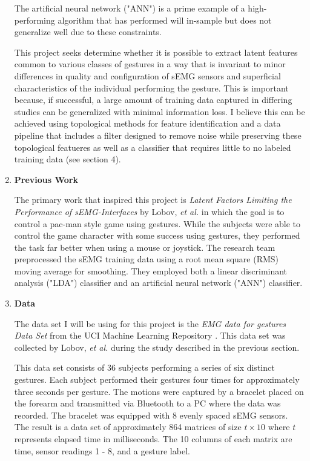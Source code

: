 \documentclass[11pt]{article}
\begin{document}
\begin{enumerate}
The artificial neural network ("ANN") is a prime example of a high-performing algorithm that has performed will in-sample but does not generalize well due to these constraints.

This project seeks determine whether it is possible to extract latent features common to various classes of gestures in a way that is invariant to minor differences in quality and configuration of sEMG sensors and superficial characteristics of the individual performing the gesture. This is important because, if successful, a large amount of training data captured in differing studies can be generalized with minimal information loss. I believe this can be achieved using topological methods for feature identification and a data pipeline that includes a filter designed to remove noise while preserving these topological featueres as well as a classifier that requires little to no labeled training data (see section 4).


\item \textbf{Previous Work}

The primary work that inspired this project is  \emph{Latent Factors Limiting the Performance of sEMG-Interfaces} by Lobov, \emph{et al.} \cite{lobov} in which the goal is to control a pac-man style game using gestures. While the subjects were able to control the game character with some success using gestures, they performed the task far better when using a mouse or joystick. The research team preprocessed the sEMG training data using a root mean square (RMS) moving average for smoothing. They employed both a linear discriminant analysis ("LDA") classifier and an artificial neural network ("ANN") classifier.

\item \textbf{Data}

The data set I will be using for this project is the \emph{EMG data for gestures Data Set} from the UCI Machine Learning Repository \cite{uci}. This data set was collected by Lobov, \emph{et al.} during the study described in the previous section.

This data set consists of 36 subjects performing a series of six distinct gestures. Each subject performed their gestures four times for approximately three seconds per gesture. The motions were captured by a bracelet placed on the forearm and transmitted via Bluetooth to a PC where the data was recorded. The bracelet was equipped with 8 evenly spaced sEMG sensors. The result is a data set of approximately 864 matrices of size $t \times 10$ where $t$ represents elapsed time in milliseconds. The 10 columns of each matrix are time, sensor readings 1 - 8, and a gesture label.


\end{enumerate}
\end{document}
